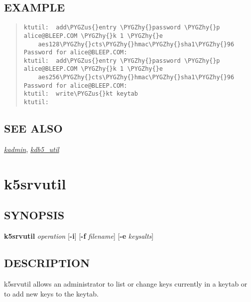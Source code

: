 \documentclass[letterpaper,10pt,english]{sphinxmanual}
\def\PYGZus{\char`\_}
\def\PYGZhy{\char`\-}
\begin{document}
\subsection{EXAMPLE}
\label{admin/admin_commands/ktutil:example}\begin{quote}

\begin{Verbatim}[commandchars=\\\{\}]
ktutil:  add\PYGZus{}entry \PYGZhy{}password \PYGZhy{}p alice@BLEEP.COM \PYGZhy{}k 1 \PYGZhy{}e
    aes128\PYGZhy{}cts\PYGZhy{}hmac\PYGZhy{}sha1\PYGZhy{}96
Password for alice@BLEEP.COM:
ktutil:  add\PYGZus{}entry \PYGZhy{}password \PYGZhy{}p alice@BLEEP.COM \PYGZhy{}k 1 \PYGZhy{}e
    aes256\PYGZhy{}cts\PYGZhy{}hmac\PYGZhy{}sha1\PYGZhy{}96
Password for alice@BLEEP.COM:
ktutil:  write\PYGZus{}kt keytab
ktutil:
\end{Verbatim}
\end{quote}


\subsection{SEE ALSO}
\label{admin/admin_commands/ktutil:see-also}
{\hyperref[admin/admin_commands/kadmin_local:kadmin-1]{\emph{kadmin}}}, {\hyperref[admin/admin_commands/kdb5_util:kdb5-util-8]{\emph{kdb5\_util}}}


\section{k5srvutil}
\label{admin/admin_commands/k5srvutil:k5srvutil-1}\label{admin/admin_commands/k5srvutil::doc}\label{admin/admin_commands/k5srvutil:k5srvutil}

\subsection{SYNOPSIS}
\label{admin/admin_commands/k5srvutil:synopsis}
\textbf{k5srvutil} \emph{operation}
{[}\textbf{-i}{]}
{[}\textbf{-f} \emph{filename}{]}
{[}\textbf{-e} \emph{keysalts}{]}


\subsection{DESCRIPTION}
\label{admin/admin_commands/k5srvutil:description}
k5srvutil allows an administrator to list or change keys currently in
a keytab or to add new keys to the keytab.
\end{document}
